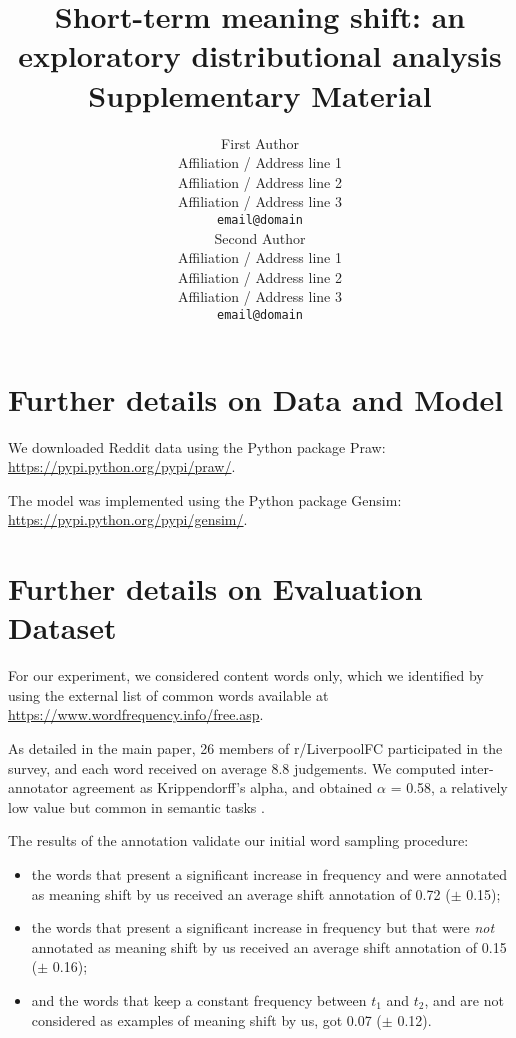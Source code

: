 \documentclass[11pt,a4paper]{article}
\title{Short-term meaning shift: an exploratory distributional analysis\\
\vspace*{0.5cm}
Supplementary Material}
\author{First Author \\
  Affiliation / Address line 1 \\
  Affiliation / Address line 2 \\
  Affiliation / Address line 3 \\
  {\tt email@domain} \\\And
  Second Author \\
  Affiliation / Address line 1 \\
  Affiliation / Address line 2 \\
  Affiliation / Address line 3 \\
  {\tt email@domain} \\}
\date{}
\begin{document}
\maketitle

%
%
%
%



\section{Further details on Data and Model}
We downloaded Reddit data using the Python package Praw: \url{https://pypi.python.org/pypi/praw/}.

The model was implemented using the Python package Gensim: \url{https://pypi.python.org/pypi/gensim/}.

\section{Further details on Evaluation Dataset}

For our experiment, we considered content words only, which we identified by using the external list of common words available at \url{https://www.wordfrequency.info/free.asp}.

As detailed in the main paper, 26 members of r/LiverpoolFC participated in the survey, and each word received on average 8.8 judgements. We computed inter-annotator agreement as Krippendorff's alpha, and obtained $\alpha$ = 0.58, a relatively low value but common in semantic tasks \cite{artstein2008inter}.

The results of the annotation validate our initial word sampling procedure:

\begin{itemize}
\item  the words that present a significant increase in frequency and were annotated as
meaning shift by us received an average shift annotation of 0.72 ($\pm$ 0.15);
\item the words that present a
significant increase in frequency but that were \emph{not} annotated as
meaning shift by us received an average shift annotation of  0.15 ($\pm$ 0.16);
\item and the words that keep a constant frequency between $t_1$ and $t_2$, and are not considered as examples of meaning shift by us, got 0.07 ($\pm$ 0.12).
\end{itemize}
\end{document}
